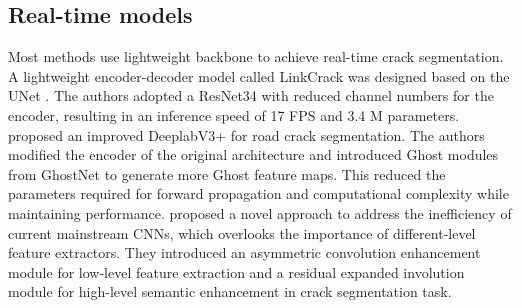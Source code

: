 \documentclass[preprint,12pt,authoryear]{elsarticle}
\begin{document}

\subsection{Real-time models}
\label{subsec:realtime}

Most methods use lightweight backbone to achieve real-time crack segmentation. A lightweight encoder-decoder model called LinkCrack was designed based on the UNet \citep{liao_automatic_2022}. The authors adopted a ResNet34 with reduced channel numbers for the encoder, resulting in an inference speed of 17 FPS and 3.4 M parameters. 
\citet{jiang_two-step_2022} proposed an improved DeeplabV3+ for road crack segmentation. The authors modified the encoder of the original architecture and introduced Ghost modules from GhostNet to generate more Ghost feature maps. This reduced the parameters required for forward propagation and computational complexity while maintaining performance. \citet{yong_riianet_2022} proposed a novel approach to address the inefficiency of current mainstream CNNs, which overlooks the importance of different-level feature extractors. They introduced an asymmetric convolution enhancement module for low-level feature extraction and a residual expanded involution module for high-level semantic enhancement in crack segmentation task.

\end{document}
